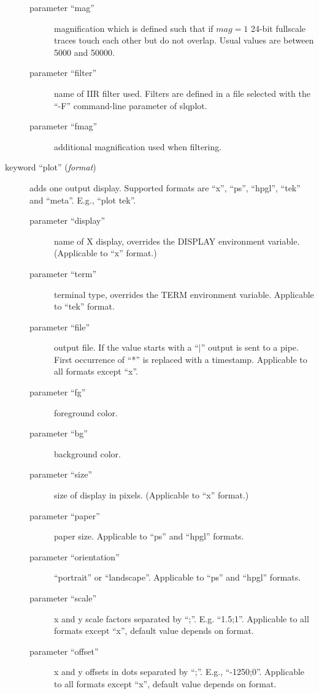 \documentclass[11pt,a4paper,titlepage]{article}
\begin{document}
\begin{description}
\begin{description}
\item[parameter ``mag'' ] magnification which is defined such
that if $mag = 1$ 24-bit fullscale traces touch each other but do not
overlap. Usual values are between 5000 and 50000.

\item[parameter ``filter''] name of IIR filter used. Filters are defined in
a file selected with the ``-F'' command-line parameter of slqplot.

\item[parameter ``fmag'' ] additional magnification used when
filtering.
\end{description}

\item[keyword ``plot'' (\textit{format})] adds one output display.
Supported formats are ``x'', ``ps'', ``hpgl'', ``tek'' and ``meta''. E.g.,
``plot tek''.

\begin{description}
\item[parameter ``display''] name of X display, overrides the DISPLAY
environment variable. (Applicable to ``x'' format.)

\item[parameter ``term''] terminal type, overrides the TERM environment
variable. Applicable to ``tek'' format.

\item[parameter ``file''] output file. If the value starts with a ``$|$''
output is sent to a pipe. First occurrence of ``*'' is replaced with a
timestamp. Applicable to all formats except ``x''.

\item[parameter ``fg'' ] foreground color.

\item[parameter ``bg'' ] background color.

\item[parameter ``size'' ] size of display in pixels.
(Applicable to ``x'' format.)

\item[parameter ``paper'' ] paper size. Applicable to ``ps'' and
``hpgl'' formats.

\item[parameter ``orientation'' ] ``portrait'' or
``landscape''. Applicable to ``ps'' and ``hpgl'' formats.

\item[parameter ``scale''] x and y scale factors separated by ``;''. E.g.
``1.5;1''. Applicable to all formats except ``x'', default value depends on
format.

\item[parameter ``offset''] x and y offsets in dots separated by ``;''.
E.g., ``-1250;0''. Applicable to all formats except ``x'', default value
depends on format.
\end{description}

\end{description}
\end{document}
